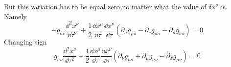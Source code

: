 %
But this variation has to be equal zero no matter what the value of $\delta
    x^\sigma$ is. Namely
%
\begin{equation}
    -g_{\sigma\nu}\frac{\dd^2 x^\nu}{\dd \tau^2} +
    \frac{1}{2}\frac{\dd x^\mu}{\dd\tau}\frac{\dd x^\nu}{\dd\tau}
    \left(
    \partial_\sigma g_{\mu\nu}  -
    \partial_\nu g_{\mu\sigma} -
    \partial_\mu g_{\sigma\nu}\right) = 0
\end{equation}
%
Changing sign
%
\begin{equation}
    \boxed{g_{\sigma\nu}\frac{\dd^2 x^\nu}{\dd \tau^2} +
        \frac{1}{2}\frac{\dd x^\mu}{\dd\tau}\frac{\dd x^\nu}{\dd\tau}
        \left(
        \partial_\nu g_{\mu\sigma} +
        \partial_\mu g_{\sigma\nu}-
        \partial_\sigma g_{\mu\nu}\right) = 0}
\end{equation}

